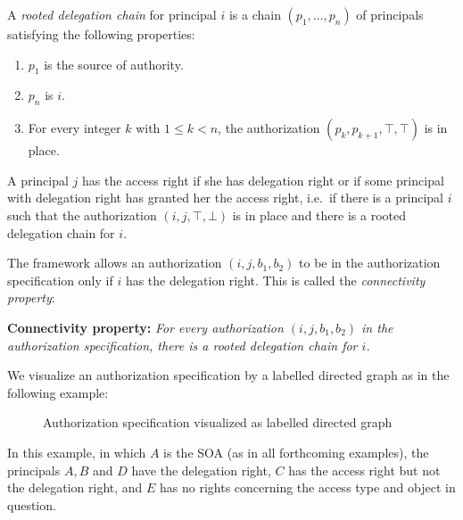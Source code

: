 \documentclass[runningheads]{llncs}
\begin{document}
\begin{definition}
 A \emph{rooted delegation chain} for principal $i$ is a chain $(p_1,\dots,p_n)$ of principals satisfying the following properties: 
 \begin{enumerate}
  \item $p_1$ is the source of authority.
  \item $p_n$ is $i$.
  \item For every integer $k$ with $1 \leq k < n$, the authorization $(p_k,p_{k+1},\top,\top)$ is in place.
 \end{enumerate}
\end{definition}


A principal $j$ has the access right if she has delegation right or if some principal with delegation right has granted her the access right, i.e.\ if there is a principal $i$ such that the authorization $(i,j,\top,\bot)$ is in place and there is a rooted delegation chain for $i$.

The framework allows an authorization $(i,j,b_1,b_2)$ to be in the authorization specification only if $i$ has the delegation right. This is called the \emph{connectivity property}:

\vspace{4mm}
\noindent \textbf{Connectivity property:} 
 \textit{For every authorization $(i,j,b_1,b_2)$ in the authorization specification, there is a rooted delegation chain for $i$.}
\vspace{4mm}

We visualize an authorization specification by a labelled directed graph as in the following example:

\vspace{-3mm}
\begin{figure}[H]
\center
{}
\caption{Authorization specification visualized as labelled directed graph}
\end{figure}
\vspace{-3mm}
In this example, in which $A$ is the SOA (as in all forthcoming examples), the principals $A,B$ and $D$ have the delegation right, $C$ has the access right but not the delegation right, and $E$ has no rights concerning the access type and object in question.
\end{document}
